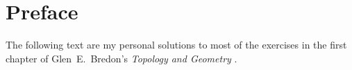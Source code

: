 \chapter{Preface}

The following text are my personal solutions to most of the exercises in the first chapter of Glen~E.~Bredon’s \emph{Topology and Geometry} \cite{bredon_topo_geo}.
